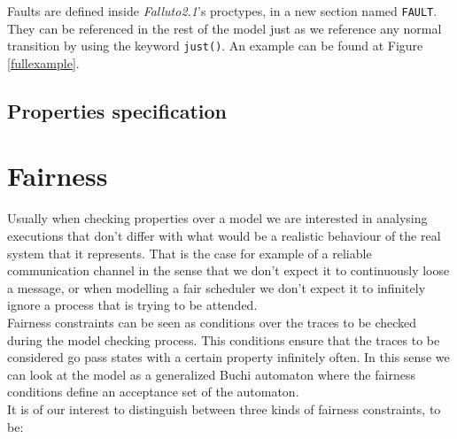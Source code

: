 \documentclass[12pt]{article}
\newcommand{\falluto}{\mbox{\textit{Falluto2.1}}}
\begin{document}
Faults are defined inside \falluto's proctypes, in a new section named \texttt{FAULT}. They can be referenced in the rest of the model just as we reference any normal transition by using the keyword \texttt{just()}. An example can be found at Figure \ref{fullexample}.
\subsection{Properties specification}

\section{Fairness}\label{fairness}

Usually when checking properties over a model we are interested in analysing 
executions that don't differ with what would be a realistic behaviour of the
real system that it represents. That is the case for example of a reliable
communication channel in the sense that we don't expect it to continuously
loose a message, or when modelling a fair scheduler we don't expect it to
infinitely ignore a process that is trying to be attended.\\
Fairness constraints can be seen as conditions over the traces to be checked
during the model checking process. This conditions ensure that the traces %
to be considered go pass states with a certain property infinitely often. In
this sense we can look at the model as a generalized Buchi automaton where %
the fairness conditions define an acceptance set of the automaton.\\
It is of our interest to distinguish between three kinds of fairness
constraints, to be:
\end{document}
